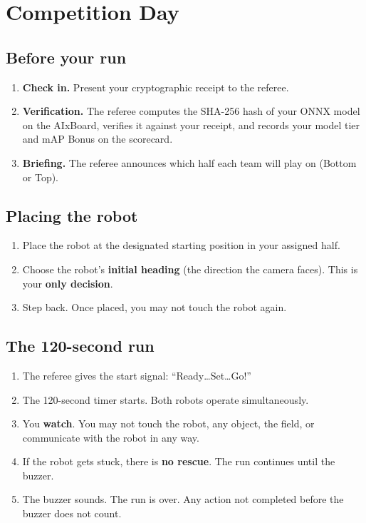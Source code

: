 \documentclass[a4]{article}
\begin{document}
\section{Competition Day}

\subsection*{Before your run}

\begin{enumerate}
    \item \textbf{Check in.} Present your cryptographic receipt to the referee.
    \item \textbf{Verification.} The referee computes the SHA-256 hash of your ONNX model on the AIxBoard, verifies it against your receipt, and records your model tier and mAP Bonus on the scorecard.
    \item \textbf{Briefing.} The referee announces which half each team will play on (Bottom or Top).
\end{enumerate}

\subsection*{Placing the robot}

\begin{enumerate}
    \item Place the robot at the designated starting position in your assigned half.
    \item Choose the robot's \textbf{initial heading} (the direction the camera faces). This is your \textbf{only decision}.
    \item Step back. Once placed, you may not touch the robot again.
\end{enumerate}

\subsection*{The 120-second run}

\begin{enumerate}
    \item The referee gives the start signal: ``Ready\ldots Set\ldots Go!''
    \item The 120-second timer starts. Both robots operate simultaneously.
    \item You \textbf{watch}. You may not touch the robot, any object, the field, or communicate with the robot in any way.
    \item If the robot gets stuck, there is \textbf{no rescue}. The run continues until the buzzer.
    \item The buzzer sounds. The run is over. Any action not completed before the buzzer does not count.
\end{enumerate}
\end{document}

